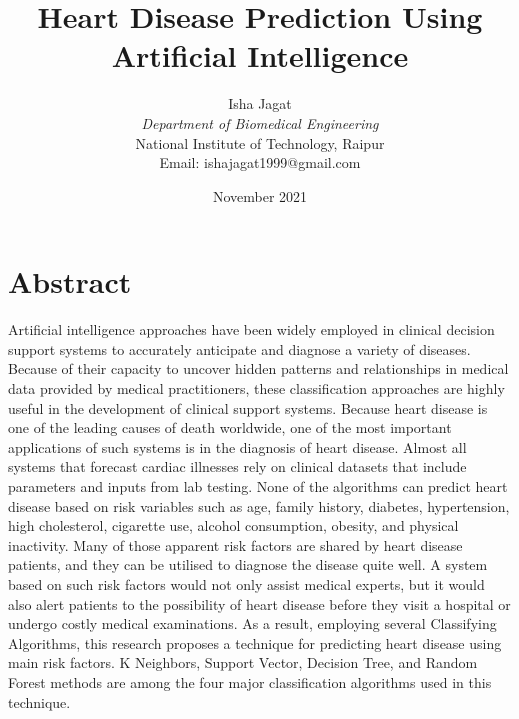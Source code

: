 \documentclass{article}
\title{\textbf{Heart Disease Prediction Using Artificial Intelligence }}
\author{Isha Jagat \\ \textit{Department of Biomedical Engineering} \\ National Institute of Technology, Raipur \\ Email: ishajagat1999@gmail.com}
\date{November 2021}
\begin{document}
\maketitle

\section{Abstract}
Artificial intelligence approaches have been widely employed in clinical decision support systems to accurately anticipate and diagnose a variety of diseases. Because of their capacity to uncover hidden patterns and relationships in medical data provided by medical practitioners, these classification approaches are highly useful in the development of clinical support systems. Because heart disease is one of the leading causes of death worldwide, one of the most important applications of such systems is in the diagnosis of heart disease. Almost all systems that forecast cardiac illnesses rely on clinical datasets that include parameters and inputs from lab testing. None of the algorithms can predict heart disease based on risk variables such as age, family history, diabetes, hypertension, high cholesterol, cigarette use, alcohol consumption, obesity, and physical inactivity. Many of those apparent risk factors are shared by heart disease patients, and they can be utilised to diagnose the disease quite well. A system based on such risk factors would not only assist medical experts, but it would also alert patients to the possibility of heart disease before they visit a hospital or undergo costly medical examinations. As a result, employing several Classifying Algorithms, this research proposes a technique for predicting heart disease using main risk factors. K Neighbors, Support Vector, Decision Tree, and Random Forest methods are among the four major classification algorithms used in this technique.
\end{document}
